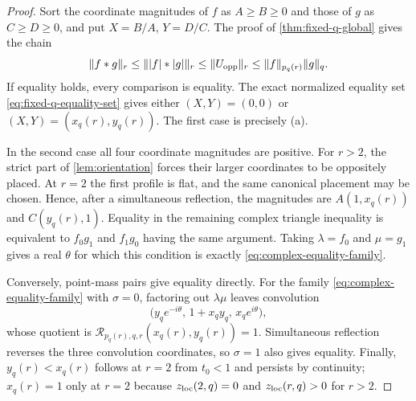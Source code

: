 \documentclass[11pt,reqno]{amsart}
\numberwithin{equation}{section}
\theoremstyle{definition}
\theoremstyle{remark}
\begin{document}
\begin{proof}
Sort the coordinate magnitudes of $f$ as $A\ge B\ge0$ and those of $g$ as
$C\ge D\ge0$, and put $X=B/A$, $Y=D/C$.  The proof of
\cref{thm:fixed-q-global} gives the chain
\[
  \|f*g\|_r
  \le\||f|*|g|\|_r
  \le\|U_{\rm opp}\|_r
  \le\|f\|_{p_q(r)}\|g\|_q.
\]
If equality holds, every comparison is equality.  The exact normalized
equality set \eqref{eq:fixed-q-equality-set} gives either
$(X,Y)=(0,0)$ or $(X,Y)=(x_q(r),y_q(r))$.  The first case is precisely
\textup{(a)}.

In the second case all four coordinate magnitudes are positive.  For $r>2$,
the strict part of \cref{lem:orientation} forces their larger coordinates to
be oppositely placed.  At $r=2$ the first profile is flat, and the same
canonical placement may be chosen.  Hence, after a simultaneous reflection,
the magnitudes are $A(1,x_q(r))$ and $C(y_q(r),1)$.
Equality in the remaining complex triangle inequality is equivalent to
$f_0g_1$ and $f_1g_0$ having the same argument.  Taking
$\lambda=f_0$ and $\mu=g_1$ gives a real $\theta$ for which this condition is
exactly \eqref{eq:complex-equality-family}.

Conversely, point-mass pairs give equality directly.  For the family
\eqref{eq:complex-equality-family} with $\sigma=0$, factoring out
$\lambda\mu$ leaves convolution
\[
  \bigl(y_qe^{-i\theta},\,1+x_qy_q,\,x_qe^{i\theta}\bigr),
\]
whose quotient is
$\mathcal R_{p_q(r),q,r}(x_q(r),y_q(r))=1$.  Simultaneous reflection reverses
the three convolution coordinates, so $\sigma=1$ also gives equality.  Finally,
$y_q(r)<x_q(r)$ follows at $r=2$ from $t_0<1$ and persists by continuity;
$x_q(r)=1$ only at $r=2$ because $z_{\rm loc}(2,q)=0$ and
$z_{\rm loc}(r,q)>0$ for $r>2$.
\end{proof}
\end{document}
